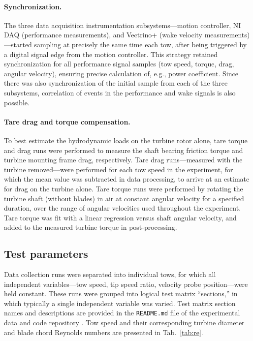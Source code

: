 \documentclass[10pt,letterpaper]{article}
\begin{document}
\paragraph{Synchronization.} The three data acquisition instrumentation
subsystems---motion controller, NI DAQ (performance measurements), and Vectrino+
(wake velocity measurements)---started sampling at precisely the same time each
tow, after being triggered by a digital signal edge from the motion controller.
This strategy retained synchronization for all performance signal samples (tow
speed, torque, drag, angular velocity), ensuring precise calculation of, e.g.,
power coefficient. Since there was also synchronization of the initial sample
from each of the three subsystems, correlation of events in the performance and
wake signals is also possible.

\paragraph{Tare drag and torque compensation.} To best estimate the hydrodynamic
loads on the turbine rotor alone, tare torque and drag runs were performed to
measure the shaft bearing friction torque and turbine mounting frame drag,
respectively. Tare drag runs---measured with the turbine removed---were
performed for each tow speed in the experiment, for which the mean value was
subtracted in data processing, to arrive at an estimate for drag on the turbine
alone. Tare torque runs were performed by rotating the turbine shaft (without
blades) in air at constant angular velocity for a specified duration, over the
range of angular velocities used throughout the experiment. Tare torque was fit
with a linear regression versus shaft angular velocity, and added to the
measured turbine torque in post-processing.


\subsection*{Test parameters}

Data collection runs were separated into individual tows, for which all
independent variables---tow speed, tip speed ratio, velocity probe
position---were held constant. These runs were grouped into logical test matrix
``sections,'' in which typically a single independent variable was varied. Test
matrix section names and descriptions are provided in the \texttt{README.md}
file of the experimental data and code repository \cite{Bachant2015-RM2-data}.
Tow speed and their corresponding turbine diameter and blade chord Reynolds
numbers are presented in Tab.~\ref{tab:re}.
\end{document}
